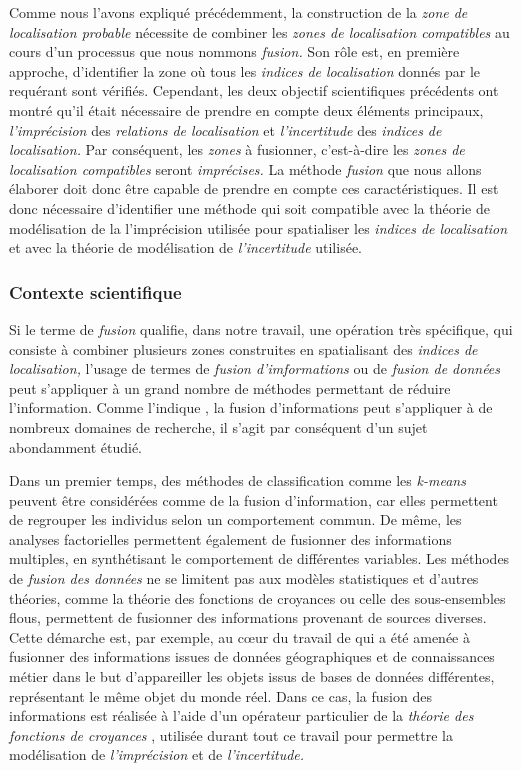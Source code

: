 Comme nous l'avons expliqué précédemment, la construction de la
\emph{zone de localisation probable} nécessite de combiner les
\emph{zones de localisation compatibles} au cours d'un processus que
nous nommons \emph{fusion.} Son rôle est, en première approche,
d'identifier la zone où tous les \emph{indices de localisation} donnés
par le requérant sont vérifiés. Cependant, les deux objectif
scientifiques précédents ont montré qu'il était nécessaire de prendre
en compte deux éléments principaux, \emph{l'imprécision} des
\emph{relations de localisation} et \emph{l'incertitude} des
\emph{indices de localisation.} Par conséquent, les \emph{zones} à
fusionner, c'est-à-dire les \emph{zones de localisation compatibles}
seront \emph{imprécises.} La méthode \emph{fusion} que nous allons
élaborer doit donc être capable de prendre en compte ces
caractéristiques. Il est donc nécessaire d'identifier une méthode qui
soit compatible avec la théorie de modélisation de la l'imprécision
utilisée pour spatialiser les \emph{indices de localisation} et avec
la théorie de modélisation de \emph{l'incertitude} utilisée.

\subsubsection{Contexte scientifique}

Si le terme de \emph{fusion} qualifie, dans notre travail, une
opération très spécifique, qui consiste à combiner plusieurs zones
construites en spatialisant des \emph{indices de localisation,}
l'usage de termes de \emph{fusion d'imformations} ou de \emph{fusion
  de données} peut s'appliquer à un grand nombre de méthodes
permettant de réduire l'information. Comme l'indique
\textcite{Castanedo2013}, la fusion d'informations peut s'appliquer à
de nombreux domaines de recherche, il s'agit par conséquent d'un sujet
abondamment étudié.

Dans un premier temps, des méthodes de classification comme les
\emph{k-means} peuvent être considérées comme de la fusion
d’information, car elles permettent de regrouper les individus selon
un comportement commun. De même, les analyses factorielles permettent
également de fusionner des informations multiples, en synthétisant le
comportement de différentes variables. Les méthodes de \emph{fusion
  des données} ne se limitent pas aux modèles statistiques et d'autres
théories, comme la théorie des fonctions de croyances ou celle des
sous-ensembles flous, permettent de fusionner des informations
provenant de sources diverses. Cette démarche est, par exemple, au
cœur du travail de \textcite{Olteanu2008} qui a été amenée à fusionner
des informations issues de données géographiques et de connaissances
métier dans le but d’appareiller les objets issus de bases de données
différentes, représentant le même objet du monde réel. Dans ce cas, la
fusion des informations est réalisée à l'aide d'un opérateur
particulier de la \emph{théorie des fonctions de croyances}
\autocite{Shafer1976}, utilisée durant tout ce travail pour permettre
la modélisation de \emph{l'imprécision} et de \emph{l'incertitude.}

